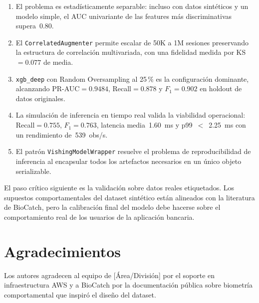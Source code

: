 \documentclass[journal]{IEEEtran}
\newcommand{\wrapcls}{\texttt{VishingModelWrapper}}
\newcommand{\augcls}{\texttt{CorrelatedAugmenter}}
\begin{document}
\begin{enumerate}
    \item El problema es estadísticamente separable: incluso con datos
    sintéticos y un modelo simple, el AUC univariante de las features más
    discriminativas supera~0.80.

    \item El \augcls{} permite escalar de 50K a 1M sesiones preservando la
    estructura de correlación multivariada, con una fidelidad medida por
    KS$=0.077$ de media.

    \item \texttt{xgb\_deep} con Random Oversampling al 25\,\% es la
    configuración dominante, alcanzando PR-AUC$=0.9484$, Recall$=0.878$ y
    $F_1=0.902$ en holdout de datos originales.

    \item La simulación de inferencia en tiempo real valida la viabilidad
    operacional: Recall$=0.755$, $F_1=0.763$, latencia media~1.60~ms y
    p99~$<$~2.25~ms con un rendimiento de~539~obs/s.

    \item El patrón \wrapcls{} resuelve el problema de reproducibilidad de
    inferencia al encapsular todos los artefactos necesarios en un único
    objeto serializable.
\end{enumerate}

El paso crítico siguiente es la validación sobre datos reales etiquetados.
Los supuestos comportamentales del dataset sintético están alineados con
la literatura de BioCatch, pero la calibración final del modelo debe hacerse
sobre el comportamiento real de los usuarios de la aplicación bancaria.

\section*{Agradecimientos}

Los autores agradecen al equipo de [Área/División] por el soporte en
infraestructura AWS y a BioCatch por la documentación pública sobre
biometría comportamental que inspiró el diseño del dataset.
\end{document}
